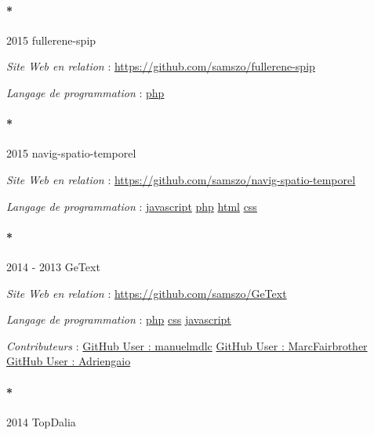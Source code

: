 \documentclass[
  a4paper,
  DIV=11,
  numbers=noendperiod]{scrreprt}
\let\oldparagraph\paragraph
\renewcommand{\paragraph}[1]{\oldparagraph{#1}\mbox{}}
\begin{document}
\paragraph*{2015 fullerene-spip}\label{sec-item301794}

\emph{Site Web en relation} :
\url{https://github.com/samszo/fullerene-spip}

\emph{Langage de programmation} :
\href{http://localhost/samszo/omk/s/fiches/item/108369}{php}

\paragraph*{2015 navig-spatio-temporel}\label{sec-item301799}

\emph{Site Web en relation} :
\url{https://github.com/samszo/navig-spatio-temporel}

\emph{Langage de programmation} :
\href{http://localhost/samszo/omk/s/fiches/item/89711}{javascript}
\href{http://localhost/samszo/omk/s/fiches/item/108369}{php}
\href{http://localhost/samszo/omk/s/fiches/item/96621}{html}
\href{http://localhost/samszo/omk/s/fiches/item/102418}{css}

\paragraph*{2014 - 2013 GeText}\label{sec-item301771}

\emph{Site Web en relation} : \url{https://github.com/samszo/GeText}

\emph{Langage de programmation} :
\href{http://localhost/samszo/omk/s/fiches/item/108369}{php}
\href{http://localhost/samszo/omk/s/fiches/item/102418}{css}
\href{http://localhost/samszo/omk/s/fiches/item/89711}{javascript}

\emph{Contributeurs} :
\href{http://localhost/samszo/omk/s/fiches/item/300977}{GitHub User :
manuelmdlc}
\href{http://localhost/samszo/omk/s/fiches/item/300973}{GitHub User :
MarcFairbrother}
\href{http://localhost/samszo/omk/s/fiches/item/301031}{GitHub User :
Adriengaio}

\paragraph*{2014 TopDalia}\label{topdalia}
\end{document}
